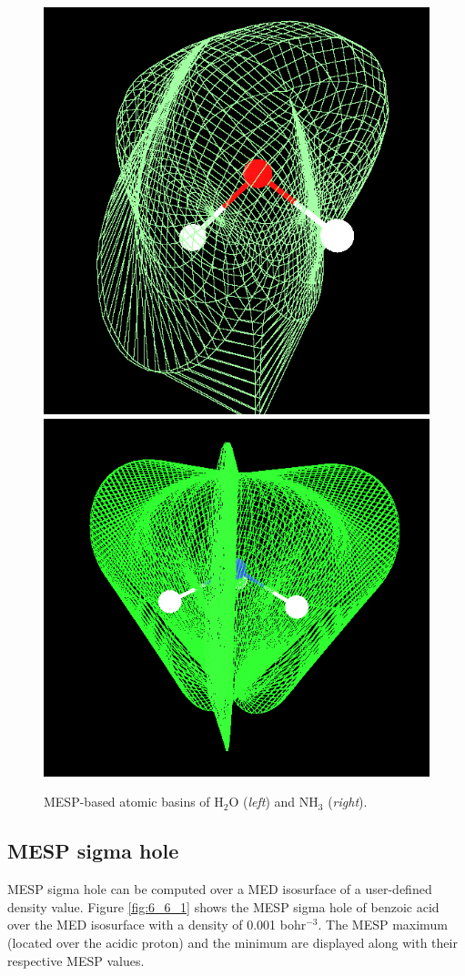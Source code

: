 \documentclass[10pt]{article}
\begin{document}
  
\begin{figure}[H]
\begin{center}
\includegraphics[width=.30\linewidth]{H2O-bs.jpg}
\hspace*{5mm}
\includegraphics[width=.34\linewidth]{NH3-bs.jpg}
\end{center}
\caption[MESP atomic basins of H$_2$O and NH$_3$]{MESP-based atomic basins of H$_2$O ({\it left}) and NH$_3$ ({\it right}).
\label{fig:6_5_3}}
\end{figure}

\subsection{MESP sigma hole \label{sec:6.6} }

MESP sigma hole can be computed over a MED isosurface of a user-defined density value. Figure \ref{fig:6_6_1} shows the
MESP sigma hole of benzoic acid over the MED isosurface with a density of
0.001 bohr$^{-3}$. The MESP maximum (located over the acidic proton) and the minimum 
are displayed along with their respective MESP values.
\end{document}
